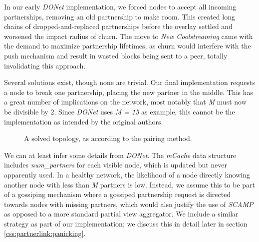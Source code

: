 \documentclass[12pt,a4paper]{article}
\begin{document}
In our early \textit{DONet} implementation, we forced nodes to accept all incoming partnerships, removing an old partnership to make room. This created long chains of dropped-and-replaced partnerships before the overlay settled and worsened the impact radius of churn. The move to \textit{New Coolstreaming} came with the demand to maximize partnership lifetimes, as churn would interfere with the push mechanism and result in wasted blocks being sent to a peer, totally invalidating this approach.

Several solutions exist, though none are trivial. Our final implementation requests a node to break one partnership, placing the new partner in the middle. This has a great number of implications on the network, most notably that \textit{M} must now be divisible by 2. Since \textit{DONet} uses \textit{M = 15} as example, this cannot be the implementation as intended by the original authors.

\begin{figure}[!ht]
	\centering
	\caption{A solved topology, as according to the pairing method.}
	\label{fig2}
\end{figure}

We can at least infer some details from \textit{DONet}. The \textit{mCache} data structure includes \textit{num\_partners} for each visible node, which is updated but never apparently used. In a healthy network, the likelihood of a node directly knowing another node with less than \textit{M} partners is low. Instead, we assume this to be part of a gossiping mechanism where a gossiped partnership request is directed towards nodes with missing partners, which would also justify the use of \textit{SCAMP} as opposed to a more standard partial view aggregator. We include a similar strategy as part of our implementation; we discuss this in detail later in section \ref{css:partnerlink:panicking}.
\end{document}
